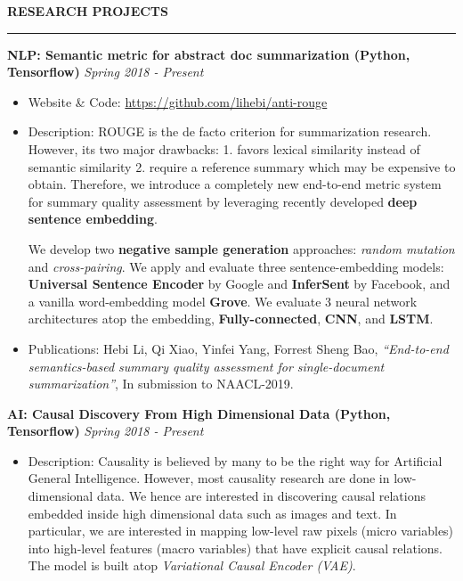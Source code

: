 \documentclass[10pt,letterpaper]{article}
\newenvironment{mysection}[1]{ %
  \medskip
  \MakeUppercase{\bf #1}
  \medskip
  \hrule
  \begin{list}{}{
      \setlength{\leftmargin}{1.5em}
    }
  \item[]
}{
  \end{list}
}
\begin{document}
\begin{mysection}{Research Projects}

  \textbf{NLP: Semantic metric for abstract doc summarization (Python,
    Tensorflow)} \hfill \emph{Spring 2018 - Present}
  \begin{itemize}
  \item Website \& Code: \url{https://github.com/lihebi/anti-rouge}
  \item Description: ROUGE is the de facto criterion for summarization
    research.  However, its two major drawbacks: 1. favors lexical
    similarity instead of semantic similarity 2. require a reference
    summary which may be expensive to obtain.  Therefore, we introduce
    a completely new end-to-end metric system for summary quality
    assessment by leveraging recently developed \textbf{deep sentence
      embedding}.

    We develop two \textbf{negative sample generation} approaches:
    \textit{random mutation} and \textit{cross-pairing}.  We apply and
    evaluate three sentence-embedding models: \textbf{Universal
      Sentence Encoder} by Google and \textbf{InferSent} by Facebook,
    and a vanilla word-embedding model \textbf{Grove}. We evaluate 3
    neural network architectures atop the embedding,
    \textbf{Fully-connected}, \textbf{CNN}, and \textbf{LSTM}.

  \item Publications: Hebi Li, Qi Xiao, Yinfei Yang, Forrest Sheng Bao,
      \textit{``End-to-end semantics-based summary quality assessment
        for single-document summarization''}, In submission to
      NAACL-2019.
  \end{itemize}
  
  \textbf{AI: Causal Discovery From High Dimensional Data (Python,
    Tensorflow)} \hfill \emph{Spring 2018 - Present}

  \begin{itemize}
  \item Description: Causality is believed by many to be the right way
    for Artificial General Intelligence. However, most causality
    research are done in low-dimensional data. We hence are interested
    in discovering causal relations embedded inside high dimensional
    data such as images and text. In particular, we are interested in
    mapping low-level raw pixels (micro variables) into high-level
    features (macro variables) that have explicit causal relations.
    The model is built atop \emph{Variational Causal Encoder (VAE)}.
  \end{itemize}
  

\end{mysection}
\end{document}
